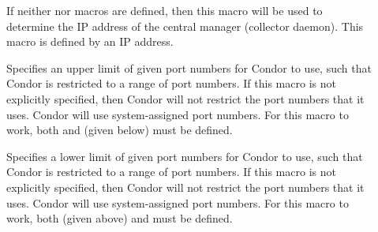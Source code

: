 \begin{description}
\item[] \label{param:CMIPAddr}
  If neither  nor 
   macros are defined, then this
  macro will be used to determine the IP address of the central
  manager (collector daemon).
  This macro is defined by an IP address.

\item[] \label{param:HighPort}
  Specifies an upper limit of given port numbers for Condor to use,
  such that Condor is restricted to a range of port numbers.
  If this macro is not explicitly specified, then Condor will
  not restrict the port numbers that it uses. Condor will use
  system-assigned port numbers.
  For this macro to work, both  and
   (given below) must be defined.

\item[] \label{param:LowPort}
  Specifies a lower limit of given port numbers for Condor to use,
  such that Condor is restricted to a range of port numbers.
  If this macro is not explicitly specified, then Condor will
  not restrict the port numbers that it uses. Condor will use
  system-assigned port numbers.
  For this macro to work, both  (given above) and
   must be defined.


\end{description}

